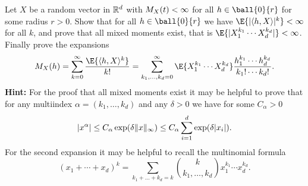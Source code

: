 
\begin{exercise}[subtitle={Multivariate moment generating function \Coffeecup\Coffeecup}]
    \label{ex: multivariate moment generating function}
    Let \(X\) be a random vector in \(\mathbb{R}^d\) with \(M_X(t) < \infty\)
    for all \(h\in \ball{0}{r}\) for some radius \(r > 0\). Show that for all
    \(h \in \ball{0}{r}\) we have \(\E{\abs{\scp{h, X}}^k} < \infty\) for all \(k\),
    and prove that all mixed moments exist, that is \(\E{\abs{X_1^{k_1} \cdots
    X_d^{k_d}}}< \infty\). Finally prove the expansions
    \[
        \MGF_X(h) = \sum_{k=0}^\infty \frac{\E{\scp{h, X}^k}}{k!}
        = \sum_{k_1, \dots, k_d = 0}^\infty
        \E{X_1^{k_1} \cdots X_d^{k_d}}
        \frac{h_1^{k_1} \cdots h_d^{k_d}}{k_1! \cdots k_d!}.
    \]
    \textbf{Hint:} For the proof that all mixed moments exist it
    may be helpful to prove that for any multiindex \(\alpha = (k_1, \dots, k_d)\) 
    and any \(\delta >0\) we have for some \(C_\alpha > 0\)
    \[
        \lvert x^\alpha\rvert
        \le C_\alpha \exp(\delta \lVert x\rVert_\infty)
        \le C_\alpha \sum_{i=1}^d \exp(\delta \lvert x_i\rvert).
    \]
    For the second expansion it may be helpful to recall the multinomial formula
    \[
        (x_1 + \cdots + x_d)^k
        = \sum_{k_1+ \dots+ k_d = k}
        \binom{k}{k_1, \dots, k_d} x_1^{k_1} \cdots x_d^{k_d}.
    \]
\end{exercise}

